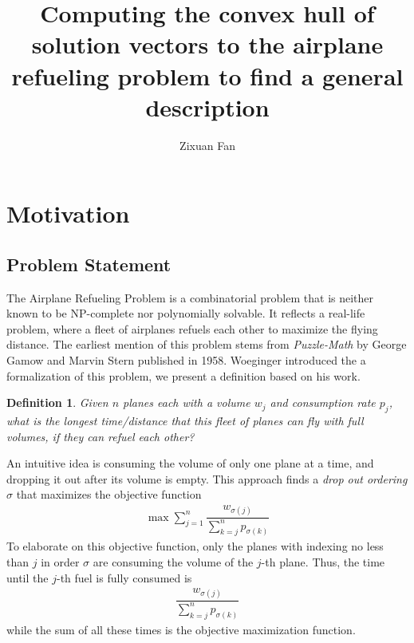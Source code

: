 \documentclass[12pt,letterpaper]{article}
\title{Computing the convex hull of solution vectors to the airplane refueling problem to find a general description}
\author{Zixuan Fan}
\newtheorem{definition}[theorem]{Definition}
\begin{document}
\maketitle

\section{Motivation}

\subsection{Problem Statement}
The Airplane Refueling Problem is a combinatorial problem that is 
neither known to be NP-complete nor polynomially solvable. 
It reflects a real-life problem, where a fleet of airplanes refuels each other 
to maximize the flying distance. The earliest mention of this problem stems 
from \textit{Puzzle-Math} \cite{gamow1958puzzle} by George Gamow and Marvin Stern published in 1958.    
Woeginger introduced the a formalization of this problem, 
we present a definition based on his work. \cite{woeginger2010scheduling}
\begin{definition}
 Given $n$ planes each with a volume $w_j$ and consumption rate $p_j$,
 what is the longest time/distance that this fleet of planes can fly with full volumes,
 if they can refuel each other?
\end{definition}
An intuitive idea is consuming the volume of only one plane 
at a time, and dropping it out after its volume is empty. This approach 
finds a \textit{drop out ordering} $\sigma$
that maximizes the objective function 
\begin{align*}
    \max \sum_{j=1}^{n} \dfrac{w_{\sigma(j)}}{\sum_{k = j}^n p_{\sigma(k)}}
\end{align*}
To elaborate on this objective function, only the planes with indexing no less than $j$ in order $\sigma$
are consuming the volume of the $j$-th plane. Thus, the time until the $j$-th fuel is fully consumed is 
\begin{align*}
    \dfrac{w_{\sigma(j)}}{\sum_{k = j}^n p_{\sigma(k)}}
\end{align*}
while the sum of all these times is the objective maximization function.
\end{document}
